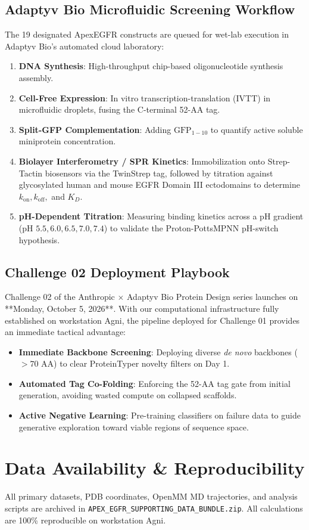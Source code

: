 \documentclass[11pt]{article}
\begin{document}
\subsection{Adaptyv Bio Microfluidic Screening Workflow}
The 19 designated ApexEGFR constructs are queued for wet-lab execution in Adaptyv Bio's automated cloud laboratory:
\begin{enumerate}
    \item \textbf{DNA Synthesis}: High-throughput chip-based oligonucleotide synthesis assembly.
    \item \textbf{Cell-Free Expression}: In vitro transcription-translation (IVTT) in microfluidic droplets, fusing the C-terminal 52-AA tag.
    \item \textbf{Split-GFP Complementation}: Adding $\text{GFP}_{1-10}$ to quantify active soluble miniprotein concentration.
    \item \textbf{Biolayer Interferometry / SPR Kinetics}: Immobilization onto Strep-Tactin biosensors via the TwinStrep tag, followed by titration against glycosylated human and mouse EGFR Domain III ectodomains to determine $k_{\text{on}}, k_{\text{off}},$ and $K_D$.
    \item \textbf{pH-Dependent Titration}: Measuring binding kinetics across a pH gradient ($\text{pH } 5.5, 6.0, 6.5, 7.0, 7.4$) to validate the Proton-PottsMPNN pH-switch hypothesis.
\end{enumerate}

\subsection{Challenge 02 Deployment Playbook}
Challenge 02 of the Anthropic $\times$ Adaptyv Bio Protein Design series launches on **Monday, October 5, 2026**. With our computational infrastructure fully established on workstation Agni, the pipeline deployed for Challenge 01 provides an immediate tactical advantage:
\begin{itemize}
    \item \textbf{Immediate Backbone Screening}: Deploying diverse \textit{de novo} backbones ($>70\text{ AA}$) to clear ProteinTyper novelty filters on Day 1.
    \item \textbf{Automated Tag Co-Folding}: Enforcing the 52-AA tag gate from initial generation, avoiding wasted compute on collapsed scaffolds.
    \item \textbf{Active Negative Learning}: Pre-training classifiers on failure data to guide generative exploration toward viable regions of sequence space.
\end{itemize}

\section*{Data Availability \& Reproducibility}
All primary datasets, PDB coordinates, OpenMM MD trajectories, and analysis scripts are archived in \texttt{APEX\_EGFR\_SUPPORTING\_DATA\_BUNDLE.zip}. All calculations are 100\% reproducible on workstation Agni.
\end{document}
